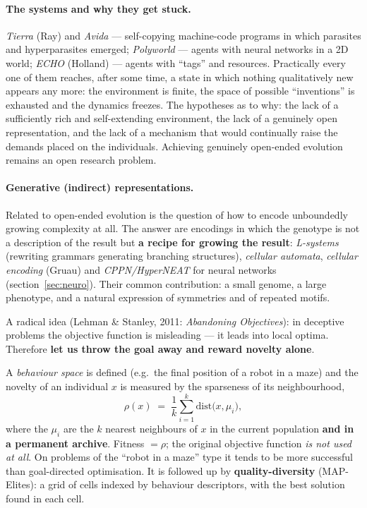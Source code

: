 \documentclass[11pt,a4paper]{article}
\theoremstyle{definition}
\providecommand{\uv}[1]{``#1''}
\begin{document}
\paragraph{The systems and why they get stuck.} \emph{Tierra} (Ray) and \emph{Avida} ---
self-copying machine-code programs in which parasites and hyperparasites emerged;
\emph{Polyworld} --- agents with neural networks in a 2D world; \emph{ECHO} (Holland) ---
agents with \uv{tags} and resources. Practically every one of them reaches, after some time,
a state in which nothing qualitatively new appears any more: the environment is finite, the
space of possible \uv{inventions} is exhausted and the dynamics freezes. The hypotheses as to
why: the lack of a sufficiently rich and self-extending environment, the lack of a genuinely
open representation, and the lack of a mechanism that would continually raise the demands
placed on the individuals. Achieving genuinely open-ended evolution remains an open research
problem.

\paragraph{Generative (indirect) representations.} Related to open-ended evolution is the
question of how to encode unboundedly growing complexity at all. The answer are encodings in
which the genotype is not a description of the result but \textbf{a recipe for growing the
result}: \emph{L-systems} (rewriting grammars generating branching structures),
\emph{cellular automata}, \emph{cellular encoding} (Gruau) and \emph{CPPN/HyperNEAT} for
neural networks (section~\ref{sec:neuro}). Their common contribution: a small genome, a large
phenotype, and a natural expression of symmetries and of repeated motifs.

\begin{defbox}
A radical idea (Lehman \& Stanley, 2011: \emph{Abandoning Objectives}): in deceptive problems
the objective function is misleading --- it leads into local optima. Therefore \textbf{let us
throw the goal away and reward novelty alone}.

A \emph{behaviour space} is defined (e.g.\ the final position of a robot in a maze) and the
novelty of an individual $x$ is measured by the sparseness of its neighbourhood,
\[
\rho(x) \;=\; \frac{1}{k}\sum_{i=1}^{k} \mathrm{dist}\big(x, \mu_i\big),
\]
where the $\mu_i$ are the $k$ nearest neighbours of $x$ in the current population
\textbf{and in a permanent archive}. Fitness $=\rho$; the original objective function
\emph{is not used at all}. On problems of the \uv{robot in a maze} type it tends to be more
successful than goal-directed optimisation. It is followed up by
\textbf{quality-diversity} (MAP-Elites): a grid of cells indexed by behaviour descriptors,
with the best solution found in each cell.
\end{defbox}
\end{document}
